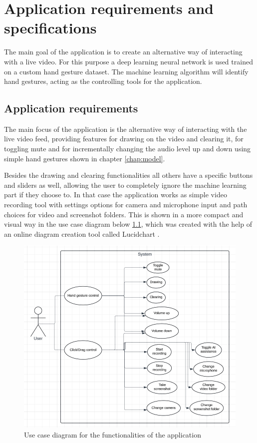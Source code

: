 \chapter{Application requirements and specifications}
\label{chap:specs}

\par The main goal of the application is to create an alternative way of interacting with a live video. For this purpose a deep learning neural network is used trained on a custom hand gesture dataset. The machine learning algorithm will identify hand gestures, acting as the controlling tools for the application. 

\section{Application requirements}
\label{sec:specssec1}

\par The main focus of the application is the alternative way of interacting with the live video feed, providing features for drawing on the video and clearing it, for toggling mute and for incrementally changing the audio level up and down using simple hand gestures shown in chapter \ref{chap:model}.
\par Besides the drawing and clearing functionalities all others have a specific buttons and sliders as well, allowing the user to completely ignore the machine learning part if they choose to. In that case the application works as simple video recording tool with settings options for camera and microphone input and path choices for video and screenshot folders. This is shown in a more compact and visual way in the use case diagram below \ref{fig:usecase}, which was created with the help of an online diagram creation tool called Lucidchart \cite{lucidchart}.

\begin{figure}
    \centering
    \includegraphics[width=0.6\linewidth]{figures/UseCaseDiagram.png}
    \caption{Use case diagram for the functionalities of the application}
    \label{fig:usecase}
\end{figure}

